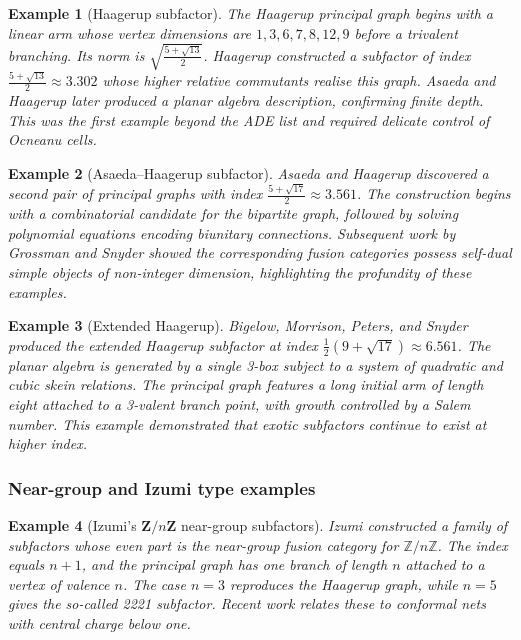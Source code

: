 \documentclass[11pt, a4paper]{article}
\theoremstyle{colored_def}
\theoremstyle{colored_thm}
\theoremstyle{colored_ex}
\newtheorem{example}{Example}[section]
\begin{document}
\begin{example}[Haagerup subfactor]\label{ex:haagerup}
The Haagerup principal graph begins with a linear arm whose vertex dimensions are $1,3,6,7,8,12,9$ before a trivalent branching. Its norm is $\sqrt{\frac{5 + \sqrt{13}}{2}}$. Haagerup constructed a subfactor of index $\frac{5 + \sqrt{13}}{2} \approx 3.302$ whose higher relative commutants realise this graph. Asaeda and Haagerup later produced a planar algebra description, confirming finite depth. This was the first example beyond the ADE list and required delicate control of Ocneanu cells.
\end{example}

\begin{example}[Asaeda--Haagerup subfactor]\label{ex:asaeda-haagerup}
Asaeda and Haagerup discovered a second pair of principal graphs with index $\frac{5 + \sqrt{17}}{2} \approx 3.561$. The construction begins with a combinatorial candidate for the bipartite graph, followed by solving polynomial equations encoding biunitary connections. Subsequent work by Grossman and Snyder showed the corresponding fusion categories possess self-dual simple objects of non-integer dimension, highlighting the profundity of these examples.
\end{example}

\begin{example}[Extended Haagerup]\label{ex:extended-haagerup}
Bigelow, Morrison, Peters, and Snyder produced the extended Haagerup subfactor at index $\frac{1}{2}\left(9 + \sqrt{17}\right) \approx 6.561$. The planar algebra is generated by a single 3-box subject to a system of quadratic and cubic skein relations. The principal graph features a long initial arm of length eight attached to a 3-valent branch point, with growth controlled by a Salem number. This example demonstrated that exotic subfactors continue to exist at higher index.
\end{example}

\subsubsection{Near-group and Izumi type examples}

\begin{example}[Izumi's $ \mathbf{Z}/n\mathbf{Z}$ near-group subfactors]\label{ex:izumi}
Izumi constructed a family of subfactors whose even part is the near-group fusion category for $\mathbb{Z}/n\mathbb{Z}$. The index equals $n + 1$, and the principal graph has one branch of length $n$ attached to a vertex of valence $n$. The case $n = 3$ reproduces the Haagerup graph, while $n = 5$ gives the so-called 2221 subfactor. Recent work relates these to conformal nets with central charge below one.
\end{example}
\end{document}
